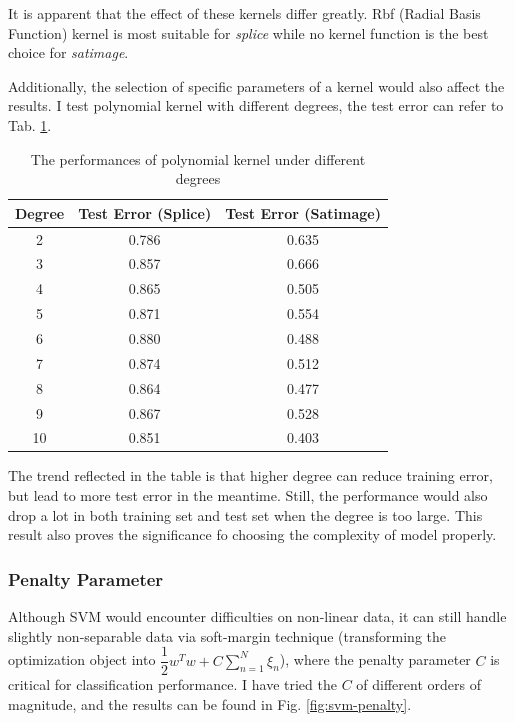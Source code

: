 \documentclass[12pt,a4paper]{article}
\theoremstyle{definition}
\begin{document}
It is apparent that the effect of these kernels differ greatly. Rbf (Radial Basis Function) kernel is most suitable for \textit{splice} while no kernel function is the best choice for \textit{satimage}. 

\vspace{0.01\linewidth}
Additionally, the selection of specific parameters of a kernel would also affect the results. I test polynomial kernel with different degrees, the test error can refer to Tab. \ref{tab:kernel-poly}.

\begin{table}[H]
	\renewcommand\arraystretch{1.35}
	\caption{The performances of polynomial kernel under different degrees}
	\label{tab:kernel-poly}
	\centering
	
	\begin{tabular}{c|c|c}
		\centering
		Degree & Test Error (Splice) & Test Error (Satimage) \\
		\hline
		
		2 & 0.786 & 0.635 \\
		3 & 0.857 & 0.666 \\
		4 & 0.865 & 0.505 \\
		5 & 0.871 & 0.554 \\
		6 & 0.880 & 0.488 \\
		7 & 0.874 & 0.512 \\
		8 & 0.864 & 0.477 \\
		9 & 0.867 & 0.528 \\
		10 & 0.851 & 0.403 \\
	\end{tabular}
\end{table}

The trend reflected in the table is that higher degree can reduce training error, but lead to more test error in the meantime. Still, the performance would also drop a lot in both training set and test set when the degree is too large. This result also proves the significance fo choosing the complexity of model properly.

\subsubsection{Penalty Parameter}

Although SVM would encounter difficulties on non-linear data, it can still handle slightly non-separable data via soft-margin technique (transforming the optimization object into $\dfrac{1}{2}w^Tw+C\sum\limits_{n=1}^{N}\xi_n$), where the penalty parameter $C$ is critical for classification performance. I have tried the $C$ of different orders of magnitude, and the results can be found in Fig. \ref{fig:svm-penalty}.
\end{document}
